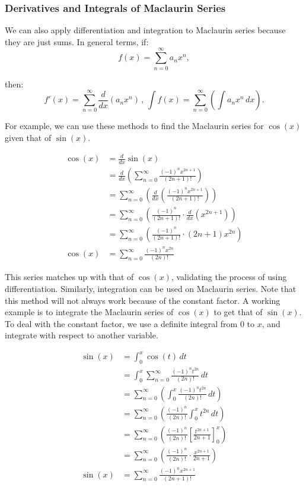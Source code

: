\documentclass[12pt]{article}
\begin{document}
\subsubsection{Derivatives and Integrals of Maclaurin Series}

We can also apply differentiation and integration to Maclaurin series because they are just sums. In general terms, if:
\[ f(x) = \sum_{n=0}^{\infty} a_n x^n, \]

\noindent then:
\[ f'(x) = \sum_{n=0}^{\infty} \frac{d}{dx} \left( a_n x^n \right) \, , \, \int f(x) = \sum_{n=0}^{\infty} \left( \int a_n x^n \, dx \right). \]

For example, we can use these methods to find the Maclaurin series for $\cos(x)$ given that of $\sin(x)$.

\begin{align*}
	\cos(x) & = \frac{d}{dx} \sin(x)                                                                         \\[6pt]
	& = \frac{d}{dx} \left( \sum_{n=0}^\infty \frac{(-1)^n x^{2n+1}}{(2n+1)!} \right)                \\[6pt]
	& = \sum_{n=0}^\infty \left( \frac{d}{dx} \left( \frac{(-1)^n x^{2n+1}}{(2n+1)!} \right) \right) \\[6pt]
	& = \sum_{n=0}^\infty \left( \frac{(-1)^n}{(2n+1)!} \cdot \frac{d}{dx} (x^{2n+1}) \right)        \\[6pt]
	& = \sum_{n=0}^\infty \left( \frac{(-1)^n}{(2n+1)!} \cdot (2n+1) x^{2n} \right)                  \\[6pt]
	\cos(x) & = \sum_{n=0}^\infty \frac{(-1)^n x^{2n}}{(2n)!}
\end{align*}

This series matches up with that of $\cos(x)$, validating the process of using differentiation. Similarly, integration can be used on Maclaurin series. Note that this method will not always work because of the constant factor. A working example is to integrate the Maclaurin series of $\cos(x)$ to get that of $\sin(x)$. To deal with the constant factor, we use a definite integral from $0$ to $x$, and integrate with respect to another variable.

\begin{align*}
	\sin(x) & = \int_0^x \cos(t) \, dt                                                                         \\
	& = \int_0^x \sum_{n=0}^\infty \frac{(-1)^n t^{2n}}{(2n)!} \, dt                                   \\[6pt]
	& = \sum_{n=0}^\infty \left( \int_0^x \frac{(-1)^n t^{2n}}{(2n)!} \, dt \right)                    \\[6pt]
	& = \sum_{n=0}^\infty \left( \frac{(-1)^n}{(2n)!} \int_0^x t^{2n} \, dt \right)                    \\[6pt]
	& = \sum_{n=0}^\infty \left( \frac{(-1)^n}{(2n)!} \left[ \frac{t^{2n+1}}{2n+1} \right]_0^x \right) \\[6pt]
	& = \sum_{n=0}^\infty \left( \frac{(-1)^n}{(2n)!} \cdot \frac{x^{2n+1}}{2n+1} \right)              \\[6pt]
	\sin(x) & = \sum_{n=0}^\infty \frac{(-1)^n x^{2n+1}}{(2n+1)!}
\end{align*}
\end{document}
